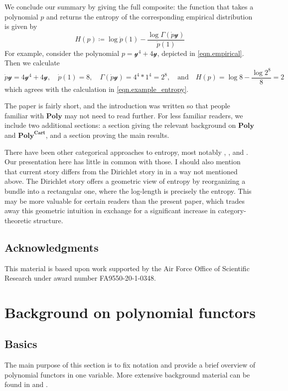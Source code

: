 \documentclass[11pt, one side, article]{memoir}
\theoremstyle{definition}
\theoremstyle{plain}
\newcommand{\Cat}[1]{\mathbf{#1}}%
\newcommand{\yon}{\mathcal{y}}
\newcommand{\poly}{\Cat{Poly}}
\newcommand{\polycart}{\poly^{\Cat{Cart}}}
\newcommand{\0}{\textsf{0}}
\newcommand{\1}{\tn{\textsf{1}}}
\newcommand{\qand}{\quad\text{and}\quad}
\begin{document}
We conclude our summary by giving the full composite: the function that takes a polynomial $p$ and returns the entropy of the corresponding empirical distribution is given by
\[
  H(p)\coloneqq\log \dot{p}(1)-\frac{\log\Gamma(\dot{p}\yon)}{\dot{p}(1)}
\]
For example, consider the polynomial $p=\yon^4+4\yon$, depicted in \eqref{eqn.empirical}. Then we calculate
\[
\dot{p}\yon=4\yon^4+4\yon
,\quad
\dot{p}(1)=8
,\quad
\Gamma(\dot{p}\yon)=4^4*1^4=2^8
,\qand 
H(p)=\log 8-\frac{\log 2^8}{8}=2
\]
which agrees with the calculation in \eqref{eqn.example_entropy}.

The paper is fairly short, and the introduction was written so that people familiar with $\poly$ may not need to read further. For less familiar readers, we include two additional sections: a section giving the relevant background on $\poly$ and $\polycart$, and a section proving the main results.

There have been other categorical approaches to entropy, most notably \cite{baez2011characterization}, \cite{baez2014bayesian}, and \cite{leinster2021entropy}. Our presentation here has little in common with those. I should also mention that current story differs from the Dirichlet story in \cite{spivak2021dirichlet} in a way not mentioned above. The Dirichlet story offers a geometric view of entropy by reorganizing a bundle into a rectangular one, where the log-length is precisely the entropy. This may be more valuable for certain readers than the present paper, which trades away this geometric intuition in exchange for a significant increase in category-theoretic structure.

\section*{Acknowledgments}
This material is based upon work supported by the Air Force Office of Scientific Research under award number FA9550-20-1-0348.

\chapter{Background on polynomial functors}\label{chap.background}

\section{Basics}


The main purpose of this section is to fix notation and provide a brief overview of polynomial functors in one variable. More extensive background material can be found in \cite{spivak2022poly} and \cite{kock2012polynomial}. 
\end{document}
